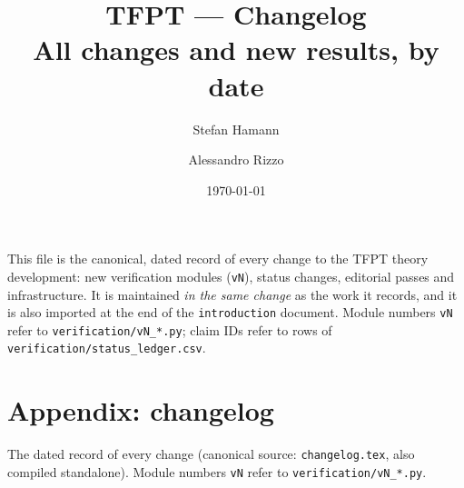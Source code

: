 \documentclass[11pt]{article}
\title{\textbf{TFPT --- Changelog}\\[1mm]\large All changes and new results, by date}
\author{Stefan Hamann \and Alessandro Rizzo}
\date{\today}
\begin{document}
\maketitle
\noindent This file is the canonical, dated record of every change to the TFPT theory
development: new verification modules (\texttt{vN}), status changes, editorial passes and
infrastructure. It is maintained \emph{in the same change} as the work it records, and it is
also imported at the end of the \texttt{introduction} document. Module numbers \texttt{vN}
refer to \texttt{verification/vN\_*.py}; claim IDs refer to rows of
\texttt{verification/status\_ledger.csv}.
\fi

\ifdefined\ChangelogImported
\clearpage
\section*{Appendix: changelog}
\noindent The dated record of every change (canonical source: \texttt{changelog.tex}, also
compiled standalone). Module numbers \texttt{vN} refer to \texttt{verification/vN\_*.py}.
\fi
\end{document}
